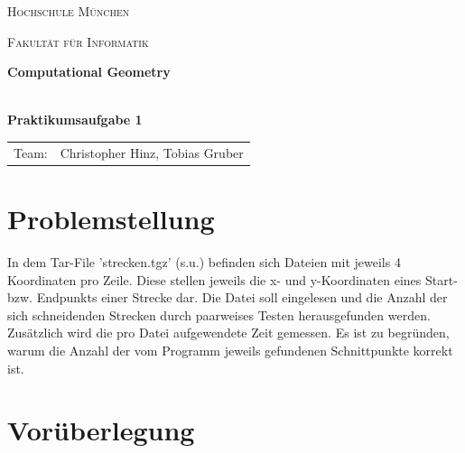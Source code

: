 \documentclass[12pt]{scrartcl}
\begin{document}
\begin{titlepage}
    \vfill
	\centering
	{\scshape\LARGE Hochschule München \par}
    {\scshape\Large Fakultät für Informatik \par}
	\vspace{1.5cm}




    \vfill
	{\LARGE\bfseries Computational Geometry\\~\\ \par}
	{\LARGE\bfseries Praktikumsaufgabe 1\par}
	\vfill
    \vfill


    \begin{tabular}{ll}
    \normalsize
    Team:  & Christopher Hinz, Tobias Gruber\\
    \end{tabular}

	\vfill

\end{titlepage}

\newpage



\raggedright

\section{Problemstellung}
In dem Tar-File 'strecken.tgz' (s.u.) befinden sich Dateien mit jeweils 4 Koordinaten pro Zeile.
Diese stellen jeweils die x- und y-Koordinaten eines Start- bzw. Endpunkts einer Strecke dar.
Die Datei soll eingelesen und die Anzahl der sich schneidenden Strecken durch paarweises Testen herausgefunden werden.
Zusätzlich wird die pro Datei aufgewendete Zeit gemessen.
Es ist zu begründen, warum die Anzahl der vom Programm jeweils gefundenen Schnittpunkte korrekt ist.


\section{Vorüberlegung}
\end{document}
